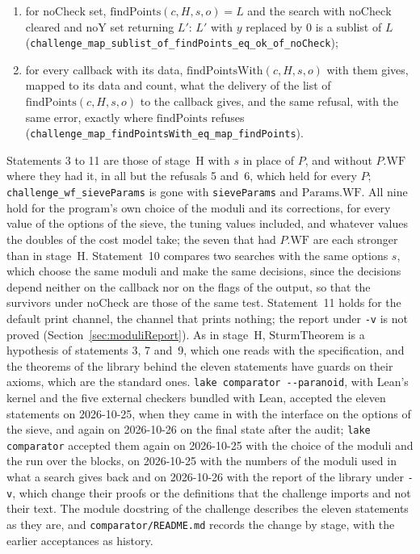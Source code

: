 \begin{enumerate}
    normalized point $(x, y, z)$ of height at most $H$ in the search region, $(x, 0, z) \in L$
    (\verb|challenge_mem_of_isPoint_of_findPoints_eq_ok_of_noCheck|);
  \item for $\mathrm{noCheck}$ set, $\mathrm{findPoints}(c, H, s, o) = L$ and the search with
    $\mathrm{noCheck}$ cleared and $\mathrm{noY}$ set returning $L'$: $L'$ with $y$ replaced by $0$
    is a sublist of $L$ (\verb|challenge_map_sublist_of_findPoints_eq_ok_of_noCheck|);
  \item for every callback with its data, $\mathrm{findPointsWith}(c, H, s, o)$ with them gives,
    mapped to its data and count, what the delivery of the list of $\mathrm{findPoints}(c, H, s, o)$
    to the callback gives, and the same refusal, with the same error, exactly where
    $\mathrm{findPoints}$ refuses (\verb|challenge_map_findPointsWith_eq_map_findPoints|).
\end{enumerate}
Statements 3 to 11 are those of stage~H with $s$ in place of $P$, and without $P.\mathrm{WF}$ where
they had it, in all but the refusals 5 and~6, which held for every $P$;
\verb|challenge_wf_sieveParams| is gone with \verb|sieveParams| and $\mathrm{Params.WF}$. All nine
hold for the program's own choice of the moduli and its corrections, for every value of the options
of the sieve, the tuning values included, and whatever values the doubles of the cost model take;
the seven that had $P.\mathrm{WF}$ are each stronger than in stage~H. Statement~10 compares two
searches with the same options $s$, which choose the same moduli and make the same decisions, since
the decisions depend neither on the callback nor on the flags of the output, so that the survivors
under $\mathrm{noCheck}$ are those of the same test. Statement~11 holds for the default print
channel, the channel that prints nothing; the report under \verb|-v| is not proved
(Section~\ref{sec:moduliReport}). As in stage~H, $\mathrm{SturmTheorem}$ is a hypothesis of
statements 3, 7 and~9, which one reads with the specification, and the theorems of the library
behind the eleven statements have guards on their axioms, which are the standard ones.
\verb|lake comparator --paranoid|, with Lean's kernel and the five external checkers bundled with
Lean, accepted the eleven statements on 2026-10-25, when they came in with the interface on the
options of the sieve, and again on 2026-10-26 on the final state after the audit;
\verb|lake comparator| accepted them again on 2026-10-25 with the choice of the moduli and the run
over the blocks, on 2026-10-25 with the numbers of the moduli used in what a search gives back and
on 2026-10-26 with the report of the library under \verb|-v|, which change their proofs or the
definitions that the challenge imports and not their text. The module docstring of the challenge
describes the eleven statements as they are, and \verb|comparator/README.md| records the change by
stage, with the earlier acceptances as history.

